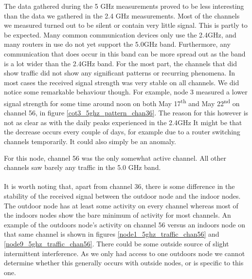 \documentclass[a4paper, 11pt]{article}
\begin{document}
The data gathered during the 5 GHz measurements proved to be less interesting than the data we gathered in the 2.4 GHz measurements. Most of the channels we measured turned out to be silent or contain very little signal. This is partly to be expected. Many common communication devices only use the 2.4GHz, and many routers in use do not yet support the 5.0GHz band. Furthermore, any communication that does occur in this band can be more spread out as the band is a lot wider than the 2.4GHz band. For the most part, the channels that did show traffic did not show any significant patterns or recurring phenomena. In most cases the received signal strength was very stable on all channels. We did notice some remarkable behaviour though. For example, node 3 measured a lower signal strength for some time around noon on both May 17\textsuperscript{th} and May 22\textsuperscript{nd} on channel 56, in figure \ref{cot3_5ghz_pattern_chan36}. The reason for this however is not as clear as with the daily peaks experienced in the 2.4GHz It might be that the decrease occurs every couple of days, for example due to a router switching channels temporarily. It could also simply be an anomaly.

For this node, channel 56 was the only somewhat active channel. All other channels saw barely any traffic in the 5.0 GHz band. \\\\
It is worth noting that, apart from channel 36, there is some difference in the stability of the received signal between the outdoor node and the indoor nodes. The outdoor node has at least some activity on every channel whereas most of the indoors nodes show the bare minimum of activity for most channels. An example of the outdoors node's activity on channel 56 versus an indoors node on that same channel is shown in figures \ref{node1_5ghz_traffic_chan56} and \ref{node9_5ghz_traffic_chan56}. There could be some outside source of slight intermittent interference. As we only had access to one outdoors node we cannot determine whether this generally occurs with outside nodes, or is specific to this one.
\end{document}
